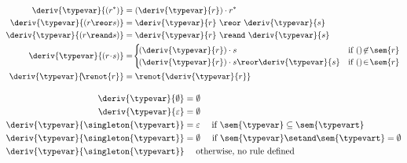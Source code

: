 \newsavebox\boxa
\begin{lrbox}{\boxa}
  \begin{minipage}{0.4\textwidth}
\begin{align*}
  \deriv{\typevar}{(r^{*})}      &= (\deriv{\typevar}{r}) \cdot r^{*}\\
  \deriv{\typevar}{(r \reor s)}   &= \deriv{\typevar}{r} ~ \reor~ \deriv{\typevar}{s}\\
  \deriv{\typevar}{(r \reand s)} &= \deriv{\typevar}{r} ~ \reand~  \deriv{\typevar}{s}\\
  \deriv{\typevar}{(r\!\cdot\! s)} & =\! \begin{cases}
    \!(\deriv{\typevar}{r})\cdot s & \text{if $()\!\not\in\!\sem{r}$} \\
    \!(\deriv{\typevar}{r})\cdot s \reor \deriv{\typevar}{s} & \text{if $()\!\in\!\sem{r}$}
  \end{cases}\\
  \deriv{\typevar}{\!\renot{r}}  &= \renot{\deriv{\typevar}{r}}
\end{align*}
  \end{minipage}
\end{lrbox}



\newsavebox\boxb
\begin{lrbox}{\boxb}
  \begin{minipage}{0.55\textwidth}
\begin{align*}
  \deriv{\typevar}{\emptyset}  &=\emptyset\\
  \deriv{\typevar}{\varepsilon} &=\emptyset\\
  \deriv{\typevar}{\singleton{\typevart}} &= \varepsilon \quad \text{ if } \sem{\typevar} \subseteq \sem{\typevart} \\
  \deriv{\typevar}{\singleton{\typevart}} &= \emptyset \quad \text{ if } \sem{\typevar} \setand \sem{\typevart}=\emptyset         \\
  \deriv{\typevar}{\singleton{\typevart}} &\quad   \text{ otherwise, no rule defined}   
\end{align*}
  \end{minipage}
\end{lrbox}



